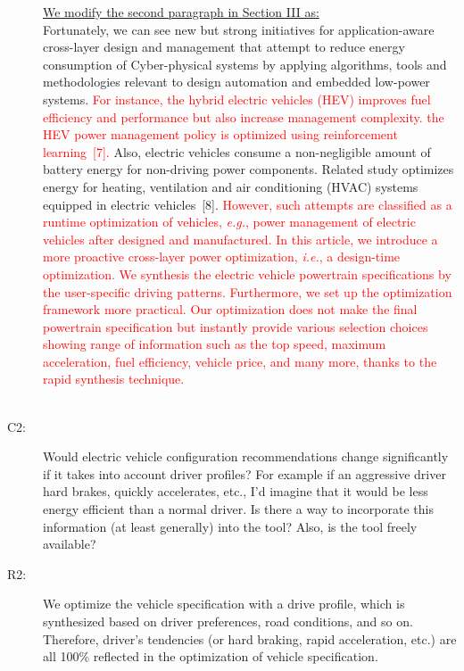 \documentclass[onecolumn]{IEEEconf}
\begin{document}
\begin{description}
\underline{We modify the second paragraph in Section III as:}\\
Fortunately, we can see new but strong initiatives for application-aware cross-layer design and management that attempt to reduce energy consumption of Cyber-physical systems by applying algorithms, tools and methodologies relevant to design automation and embedded low-power systems.
\textcolor{red}{For instance, the hybrid electric vehicles (HEV) improves fuel efficiency and performance but also increase management complexity. the HEV power management policy is optimized using reinforcement learning~[7].}
Also, electric vehicles consume a non-negligible amount of battery energy for non-driving power components. Related study optimizes energy for heating, ventilation and air conditioning (HVAC) systems equipped in electric vehicles~[8].
\textcolor{red}{However, such attempts are classified as a runtime optimization of vehicles, \textit{e.g.}, power management of electric vehicles after designed and manufactured. In this article, we introduce a more proactive cross-layer power optimization, \textit{i.e.}, a design-time optimization. We synthesis the electric vehicle powertrain specifications by the user-specific driving patterns. Furthermore, we set up the optimization framework more practical. Our optimization does not make the final powertrain specification but instantly provide various selection choices showing range of information such as the top speed, maximum acceleration, fuel efficiency, vehicle price, and many more, thanks to the rapid synthesis technique.}\\
~\\

\item [C2: ] Would electric vehicle configuration recommendations change significantly if it takes into account driver profiles? For example if an aggressive driver hard brakes, quickly accelerates, etc., I'd imagine that it would be less energy efficient than a normal driver. Is there a way to incorporate this information (at least generally) into the tool? Also, is the tool freely available?
\item [R2: ] We optimize the vehicle specification with a drive profile, which is synthesized based on driver preferences, road conditions, and so on. Therefore, driver's tendencies (or hard braking, rapid acceleration, etc.) are all 100\% reflected in the optimization of vehicle specification.\\


\end{description}
\end{document}
